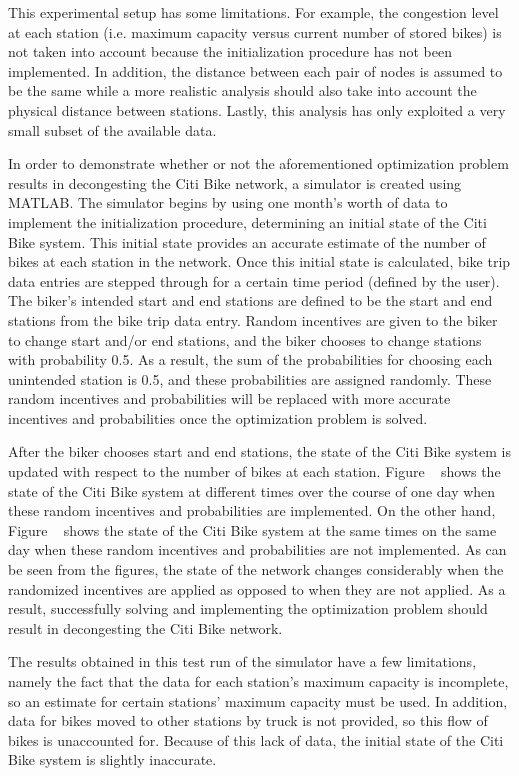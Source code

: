 \documentclass[times, 10pt,twocolumn]{article}
\begin{document}
This experimental setup has some limitations. For example, the congestion level at each station (i.e. maximum capacity versus current number of stored bikes) is not taken into account because the initialization procedure has not been implemented. In addition, the distance between each pair of nodes is assumed to be the same while a more realistic analysis should also take into account the physical distance between stations. Lastly, this analysis has only exploited a very small subset of the available data.

In order to demonstrate whether or not the aforementioned optimization problem results in decongesting the Citi Bike network, a simulator is created using MATLAB. The simulator begins by using one month's worth of data to implement the initialization procedure, determining an initial state of the Citi Bike system. This initial state provides an accurate estimate of the number of bikes at each station in the network. Once this initial state is calculated, bike trip data entries are stepped through for a certain time period (defined by the user). The biker's intended start and end stations are defined to be the start and end stations from the bike trip data entry. Random incentives are given to the biker to change start and/or end stations, and the biker chooses to change stations with probability 0.5. As a result, the sum of the probabilities for choosing each unintended station is 0.5, and these probabilities are assigned randomly. These random incentives and probabilities will be replaced with more accurate incentives and probabilities once the optimization problem is solved.

After the biker chooses start and end stations, the state of the Citi Bike system is updated with respect to the number of bikes at each station. Figure ~ shows the state of the Citi Bike system at different times over the course of one day when these random incentives and probabilities are implemented. On the other hand, Figure ~ shows the state of the Citi Bike system at the same times on the same day when these random incentives and probabilities are not implemented. As can be seen from the figures, the state of the network changes considerably when the randomized incentives are applied as opposed to when they are not applied. As a result, successfully solving and implementing the optimization problem should result in decongesting the Citi Bike network.

The results obtained in this test run of the simulator have a few limitations, namely the fact that the data for each station's maximum capacity is incomplete, so an estimate for certain stations' maximum capacity must be used. In addition, data for bikes moved to other stations by truck is not provided, so this flow of bikes is unaccounted for. Because of this lack of data, the initial state of the Citi Bike system is slightly inaccurate.
\end{document}
